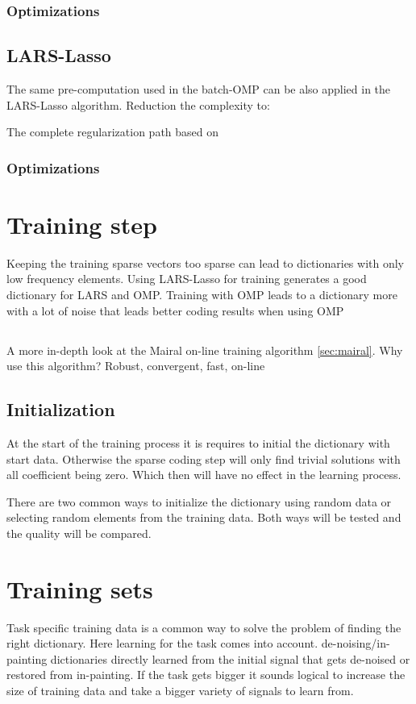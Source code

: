 \subsubsection*{Optimizations}


\subsection{LARS-Lasso}
The same pre-computation used in the batch-OMP can be also applied in the LARS-Lasso algorithm.
Reduction the complexity to: 

The complete regularization path based on \cite{Efron2004}
\subsubsection*{Optimizations}


\section{Training step}
Keeping the training sparse vectors too sparse can lead to dictionaries with only low frequency elements.
Using LARS-Lasso for training generates a good dictionary for LARS and OMP. 
Training with OMP leads to a dictionary more with a lot of noise 
that leads better coding results when using OMP 

\subsection{\trainDL}
A more in-depth look at the Mairal on-line training algorithm \ref{sec:mairal}. 
Why use this algorithm? Robust, convergent, fast, on-line

\subsection{Initialization}
At the start of the training process it is requires to initial the dictionary with start data.
Otherwise the sparse coding step will only find trivial solutions with all coefficient being zero. Which then will have no effect in the learning process.

There are two common ways to initialize the dictionary using random data or selecting random elements from the training data. Both ways will be tested and 
the quality will be compared.

\section{Training sets}
Task specific training data is a common way to solve the problem of finding the right dictionary. 
Here learning for the task comes into account. de-noising/in-painting dictionaries directly learned from the initial
signal that gets de-noised or restored from in-painting.
If the task gets bigger it sounds logical to increase the size of training data and take a bigger variety of signals to learn from.

